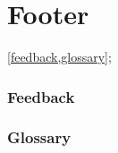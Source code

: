 \newpage
\part{Footer}
\cref{feedback,glossary};

\newpage
\section{Feedback}
\label{feedback}


\newpage
\section{Glossary}
\label{glossary}
\printglossaries